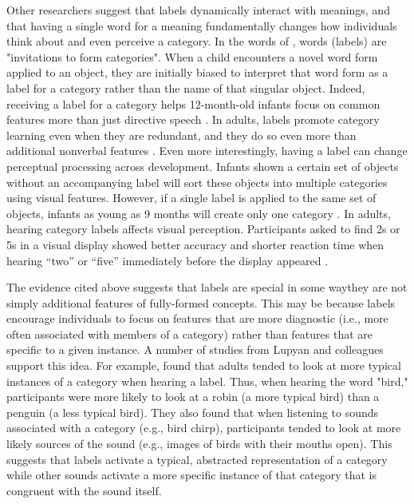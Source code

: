 \documentclass[../dissertation.tex]{subfiles}
\begin{document}
	Other researchers suggest that labels dynamically interact with meanings, and that having a single word for a meaning fundamentally changes how individuals think about and even perceive a category. In the words of \citet{Waxman1995}, words (labels) are "invitations to form categories". When a child encounters a novel word form applied to an object, they are initially biased to interpret that word form as a label for a category rather than the name of that singular object. Indeed, receiving a label for a category helps 12-month-old infants focus on common features more than just directive speech \citep{Althaus2014}. In adults, labels promote category learning even when they are redundant, and they do so even more than additional nonverbal features \citep{Lupyan2007}. Even more interestingly, having a label can change perceptual processing across development. Infants shown a certain set of objects without an accompanying label will sort these objects into multiple categories using visual features. However, if a single label is applied to the same set of objects, infants as young as 9 months will create only one category \citep{Plunkett2008, Havy2016}. In adults, hearing category labels affects visual perception. Participants asked to find 2s or 5s in a visual display showed better accuracy and shorter reaction time when hearing “two” or “five” immediately before the display appeared \citep{Lupyan2010}.  \par
	The evidence cited above suggests that labels are special in some way\textemdash they are not simply additional features of fully-formed concepts. This may be because labels encourage individuals to focus on features that are more diagnostic (i.e., more often associated with members of a category) rather than features that are specific to a given instance. A number of studies from Lupyan and colleagues support this idea. For example, \citet{Edmiston2015} found that adults tended to look at more typical instances of a category when hearing a label. Thus, when hearing the word "bird," participants were more likely to look at a robin (a more typical bird) than a penguin (a less typical bird). They also found that when listening to sounds associated with a category (e.g., bird chirp), participants tended to look at more likely sources of the sound (e.g., images of birds with their mouths open). This suggests that labels activate a typical, abstracted representation of a category while other sounds activate a more specific instance of that category that is congruent with the sound itself. \par
\end{document}
